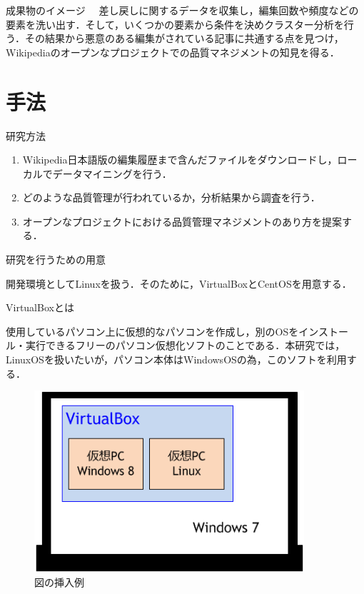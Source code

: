 成果物のイメージ
　差し戻しに関するデータを収集し，編集回数や頻度などの要素を洗い出す．そして，いくつかの要素から条件を決めクラスター分析を行う．その結果から悪意のある編集がされている記事に共通する点を見つけ，Wikipediaのオープンなプロジェクトでの品質マネジメントの知見を得る．




\chapter{手法}

研究方法

\begin{enumerate}
 \item Wikipedia日本語版の編集履歴まで含んだファイルをダウンロードし，ローカルでデータマイニングを行う．
 \item どのような品質管理が行われているか，分析結果から調査を行う．
 \item オープンなプロジェクトにおける品質管理マネジメントのあり方を提案する．
\end{enumerate}

研究を行うための用意

開発環境としてLinuxを扱う．そのために，VirtualBoxとCentOSを用意する． 



VirtualBoxとは

使用しているパソコン上に仮想的なパソコンを作成し，別のOSをインストール・実行できるフリーのパソコン仮想化ソフトのことである．本研究では，LinuxOSを扱いたいが，パソコン本体はWindowsOSの為，このソフトを利用する．


\begin{figure}[H]
\centering
\includegraphics[width=10cm]{sample10.png}
\caption{図の挿入例}\label{サンプル図}
\end{figure}





